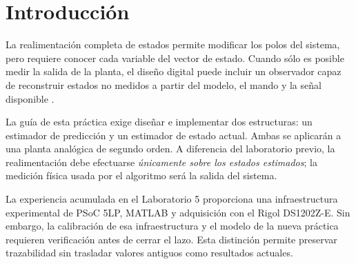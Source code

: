 \section{Introducción}
La realimentación completa de estados permite modificar los polos del sistema,
pero requiere conocer cada variable del vector de estado. Cuando sólo es posible
medir la salida de la planta, el diseño digital puede incluir un observador
capaz de reconstruir estados no medidos a partir del modelo, el mando y la
señal disponible \cite{samanta2024,fadali2020,astrom2020}.

La guía de esta práctica exige diseñar e implementar dos estructuras: un
estimador de predicción y un estimador de estado actual. Ambas se aplicarán a
una planta analógica de segundo orden. A diferencia del laboratorio previo,
la realimentación debe efectuarse \emph{únicamente sobre los estados estimados};
la medición física usada por el algoritmo será la salida del sistema.

La experiencia acumulada en el Laboratorio 5 proporciona una infraestructura
experimental de PSoC 5LP, MATLAB y adquisición con el Rigol DS1202Z-E. Sin
embargo, la calibración de esa infraestructura y el modelo de la nueva práctica
requieren verificación antes de cerrar el lazo. Esta distinción permite preservar
trazabilidad sin trasladar valores antiguos como resultados actuales.
